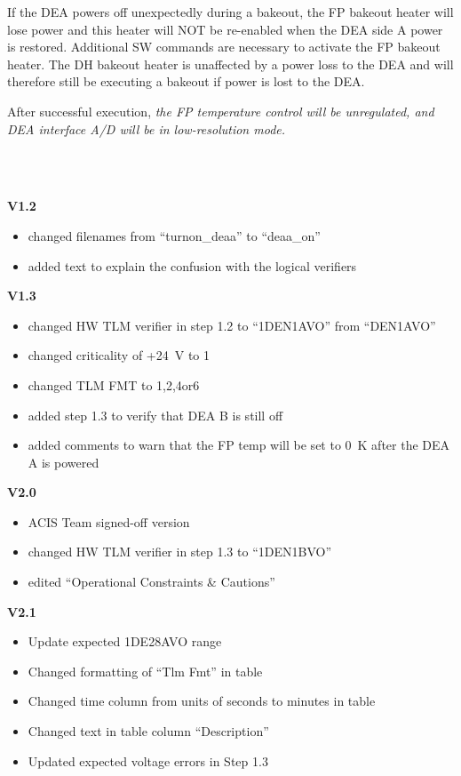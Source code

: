 \documentclass[11pt]{article}
\begin{document}
If the DEA powers off unexpectedly during a bakeout, the FP bakeout 
heater will lose power and this heater will NOT be re-enabled when the DEA side A 
power is restored. Additional SW commands are necessary to activate the FP bakeout 
heater. The DH bakeout heater is unaffected by a power loss to the DEA and will 
therefore still be executing a bakeout if power is lost to the DEA.

After successful execution, {\em the FP temperature control will be unregulated,
and DEA interface A/D will be in low-resolution mode.}\\

\vspace{0.15in}
\normalsize
{} \\
\normalsize

\normalsize
{} \\
\normalsize

{\bf V1.2}
\begin{itemize}
\item changed filenames from ``turnon\_deaa'' to
``deaa\_on''
\item added text to explain the confusion with the logical verifiers
\end{itemize}

{\bf V1.3}
\begin{itemize}
\item changed HW TLM verifier in step 1.2 to ``1DEN1AVO'' from
``DEN1AVO''
\item changed criticality of +24~V to 1
\item changed TLM FMT to 1,2,4or6
\item added step 1.3 to verify that DEA B is still off
\item added comments to warn that the FP temp will be set to 0~K after the DEA A is powered
\end{itemize}

{\bf V2.0}
\begin{itemize}
\item ACIS Team signed-off version
\item changed HW TLM verifier in step 1.3 to ``1DEN1BVO''
\item edited ``Operational Constraints \& Cautions''
\end{itemize}

{\bf V2.1}
\begin{itemize}
\item Update expected 1DE28AVO range
\item Changed formatting of ``Tlm Fmt'' in table
\item Changed time column from units of seconds to minutes in table
\item Changed text in table column ``Description''
\item Updated expected voltage errors in Step 1.3
\end{itemize}
\end{document}
